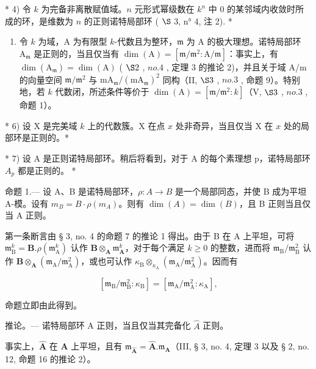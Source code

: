 * 4) 令 \(k\) 为完备非离散赋值域。\(n\) 元形式幂级数在 \(k^n\) 中 0 的某邻域内收敛时所成的环，是维数为 \(n\) 的正则诺特局部环 ( \(\S\) 3, n° 4, 注 2). *

\begin{enumerate}
\def\labelenumi{\arabic{enumi})}
\setcounter{enumi}{4}
\tightlist
\item
  令 \(k\) 为域，A 为有限型 \(k\)-代数且为整环，\(\mathfrak{m}\) 为 A 的极大理想。诺特局部环 \(\mathrm{A}_{\mathfrak{m}}\) 是正则的，当且仅当有 \(\dim(\mathrm{A}) = [\mathfrak{m}/\mathfrak{m}^{2}:\mathrm{A}/\mathfrak{m}]\)：事实上，有 \(\dim(\mathrm{A}_{\mathfrak{m}}) = \dim(\mathrm{A})\) ( \(\S 2\) , \(no. 4\) , 定理 3 的推论 2)，并且关于域 A/m 的向量空间 \(\mathfrak{m}/\mathfrak{m}^{2}\) 与 \(\mathrm{mA}_{\mathfrak{m}}/(\mathrm{mA}_{\mathfrak{m}})^{2}\) 同构（II, \(\S 3\) , \(no. 3\) , 命题 9）。特别地，若 \(k\) 代数闭，所述条件等价于 \(\dim(\mathrm{A}) = [\mathfrak{m}/\mathfrak{m}^{2}:k]\)（V, \(\S 3\) , \(no. 3\) , 命题 1）。
\end{enumerate}

* 6) 设 X 是完美域 \(k\) 上的代数簇。X 在点 \(x\) 处非奇异，当且仅当 X 在 \(x\) 处的局部环是正则的。*

* 7) 设 A 是正则诺特局部环。稍后将看到，对于 A 的每个素理想 p，诺特局部环 \(A_{p}\) 都是正则的。 *

命题 1.--- 设 A、B 是诺特局部环，\(\rho:A\to B\) 是一个局部同态，并使 B 成为平坦 A-模。设有 \(m_{B} = B \cdot \rho(m_{A})\)。则有 \(\dim(A) = \dim(B)\)，且 B 正则当且仅当 A 正则。

第一条断言由 § 3, no. 4 的命题 7 的推论 1 得出。由于 B 在 A 上平坦，可将 \(\mathfrak{m}_{\mathrm{B}}^{k} = \mathbf{B}.\rho (\mathfrak{m}_{\mathrm{A}}^{k})\) 认作 \(\mathbf{B}\otimes_{\mathbf{A}}\mathfrak{m}_{\mathbf{A}}^{k}\)，对于每个满足 \(k\geqslant 0\) 的整数，进而将 \(\mathfrak{m}_{\mathrm{B}} / \mathfrak{m}_{\mathrm{B}}^{2}\) 认作 \(\mathbf{B}\otimes_{\mathbf{A}}(\mathfrak{m}_{\mathrm{A}} / \mathfrak{m}_{\mathrm{A}}^{2})\)，或也可认作 \(\kappa_{\mathrm{B}}\otimes_{\kappa_{\mathrm{A}}}(\mathfrak{m}_{\mathrm{A}} / \mathfrak{m}_{\mathrm{A}}^{2})\)。因而有

\[
\left[ \mathfrak {m} _ {\mathrm{B}} / \mathfrak {m} _ {\mathrm{B}} ^ {2}: \kappa_ {\mathrm{B}} \right] = \left[ \mathfrak {m} _ {\mathrm{A}} / \mathfrak {m} _ {\mathrm{A}} ^ {2}: \kappa_ {\mathrm{A}} \right],\tag{2}
\]

命题立即由此得到。

推论。--- 诺特局部环 A 正则，当且仅当其完备化 \(\hat{A}\) 正则。

事实上，\(\hat{\mathbf{A}}\) 在 \(\mathbf{A}\) 上平坦，且有 \(\mathfrak{m}_{\hat{\mathbf{A}}} = \hat{\mathbf{A}}. \mathfrak{m}_{\mathbf{A}}\)（III, § 3, no. 4, 定理 3 以及 § 2, no. 12, 命题 16 的推论 2）。

